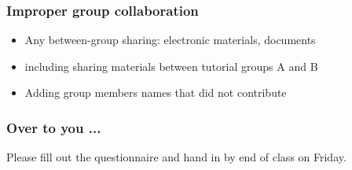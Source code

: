 \begin{frame}\frametitle{Improper group collaboration}
	\begin{itemize}
		\item	Any between-group sharing: electronic materials, documents
		\item	including sharing materials between tutorial groups A and B
		\item	Adding group members names that did not contribute
	\end{itemize}
\end{frame}

\begin{frame}\frametitle{Over to you ...}
	Please fill out the questionnaire and hand in by end of class on Friday.
\end{frame}